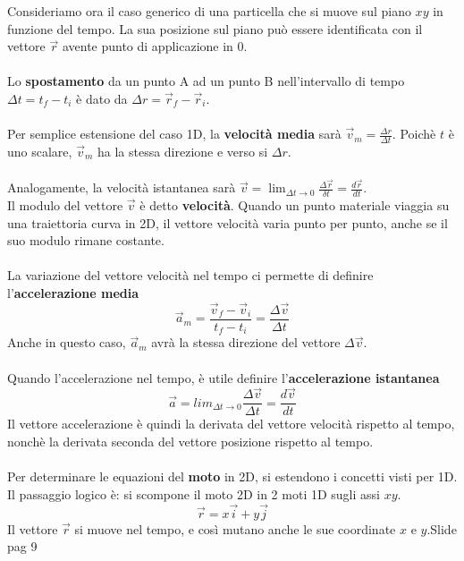 \documentclass[12pt, a4paper]{article}
\begin{document}
Consideriamo ora il caso generico di una particella che si muove sul piano $xy$ in funzione del tempo. La sua posizione sul piano può essere identificata con il vettore $\vec r$ avente punto di applicazione in 0.
\\
\\
Lo \textbf{spostamento} da un punto A ad un punto B nell'intervallo di tempo $\Delta t = t_f - t_i$ è dato da $\Delta r = \vec r_f - \vec r_i$.
\\
\\
Per semplice estensione del caso 1D, la \textbf{velocità media} sarà $\vec v_m = \frac{\Delta r}{\Delta t}$. Poichè $t$ è uno scalare, $\vec v_m$ ha la stessa direzione e verso si $\Delta r$.
\\
\\
Analogamente, la velocità istantanea sarà $\vec v = \lim_{\Delta t \to 0}{\frac{\Delta \vec r}{\delta t}} = \frac{d \vec r}{dt}$.\\
Il modulo del vettore $\vec v$ è detto \textbf{velocità}. Quando un punto materiale viaggia su una traiettoria curva in 2D, il vettore velocità varia punto per punto, anche se il suo modulo rimane costante.
\\
\\
La variazione del vettore velocità nel tempo ci permette di definire l'\textbf{accelerazione media}
\[
	\vec a_m = \frac{\vec v_f - \vec v_i}{t_f - t_i} = \frac{\Delta \vec v}{\Delta t}
\]
Anche in questo caso, $\vec a_m$ avrà la stessa direzione del vettore $\Delta \vec v$.
\\
\\
Quando l'accelerazione nel tempo, è utile definire l'\textbf{accelerazione istantanea}
\[
	\vec a = lim_{\Delta t \to 0}{\frac{\Delta \vec v}{\Delta t}} = \frac{d\vec v}{d t}
\]
Il vettore accelerazione è quindi la derivata del vettore velocità rispetto al tempo, nonchè la derivata seconda del vettore posizione rispetto al tempo.
\\
\\
Per determinare le equazioni del \textbf{moto} in 2D, si estendono i concetti visti per 1D. Il passaggio logico è: si scompone il moto 2D in 2 moti 1D sugli assi $xy$.
\[
	\vec r = x\vec i + y \vec j
\]
Il vettore $\vec r$ si muove nel tempo, e così mutano anche le sue coordinate $x$ e $y$.Slide pag 9

\end{document}
